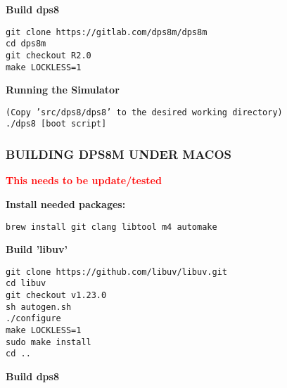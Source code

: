 \textbf{Build dps8}

\begin{adjustwidth}{5ex}{1ex}
    \texttt{git clone https://gitlab.com/dps8m/dps8m} \\
    \texttt{cd dps8m} \\
    \texttt{git checkout R2.0} \\
    \texttt{make LOCKLESS=1} \\
\end{adjustwidth}  

\textbf{Running the Simulator}

\begin{adjustwidth}{5ex}{1ex}
    \texttt{(Copy 'src/dps8/dps8' to the desired working directory)} \\
    \texttt{./dps8 [boot script]} \\
\end{adjustwidth}  

\newpage

\subsubsection[Building dps8m under MacOS]{BUILDING DPS8M UNDER MACOS}

\textbf{\textcolor{red}{This needs to be update/tested}}

\textbf{Install needed packages:}

\begin{adjustwidth}{5ex}{1ex}
	\texttt{brew install git clang libtool m4 automake} \\
\end{adjustwidth}  

\textbf{Build 'libuv'}

\begin{adjustwidth}{5ex}{1ex}
    \texttt{git clone https://github.com/libuv/libuv.git} \\
    \texttt{cd libuv} \\
    \texttt{git checkout v1.23.0} \\
    \texttt{sh autogen.sh} \\
    \texttt{./configure} \\
    \texttt{make LOCKLESS=1} \\
    \texttt{sudo make install} \\
    \texttt{cd ..} \\
\end{adjustwidth}  

\textbf{Build dps8}


